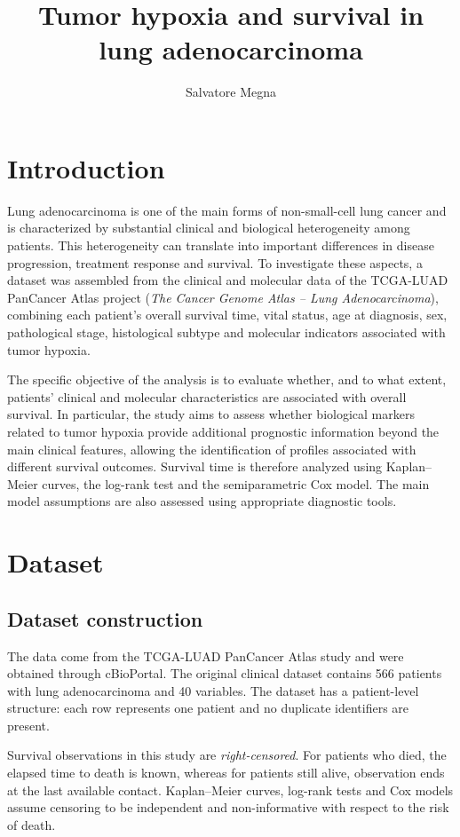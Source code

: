 \documentclass[12pt,a4paper]{article}
\title{Tumor hypoxia and survival in lung adenocarcinoma}
\author{Salvatore Megna}
\date{}
\begin{document}
\maketitle

\section{Introduction}

Lung adenocarcinoma is one of the main forms of non-small-cell lung cancer and is characterized by substantial clinical and biological heterogeneity among patients. This heterogeneity can translate into important differences in disease progression, treatment response and survival. To investigate these aspects, a dataset was assembled from the clinical and molecular data of the TCGA-LUAD PanCancer Atlas project (\textit{The Cancer Genome Atlas -- Lung Adenocarcinoma}), combining each patient's overall survival time, vital status, age at diagnosis, sex, pathological stage, histological subtype and molecular indicators associated with tumor hypoxia.

The specific objective of the analysis is to evaluate whether, and to what extent, patients' clinical and molecular characteristics are associated with overall survival. In particular, the study aims to assess whether biological markers related to tumor hypoxia provide additional prognostic information beyond the main clinical features, allowing the identification of profiles associated with different survival outcomes. Survival time is therefore analyzed using Kaplan--Meier curves, the log-rank test and the semiparametric Cox model. The main model assumptions are also assessed using appropriate diagnostic tools.

\section{Dataset}

\subsection{Dataset construction}

The data come from the TCGA-LUAD PanCancer Atlas study and were obtained through cBioPortal. The original clinical dataset contains 566 patients with lung adenocarcinoma and 40 variables. The dataset has a patient-level structure: each row represents one patient and no duplicate identifiers are present.

Survival observations in this study are \textit{right-censored}. For patients who died, the elapsed time to death is known, whereas for patients still alive, observation ends at the last available contact. Kaplan--Meier curves, log-rank tests and Cox models assume censoring to be independent and non-informative with respect to the risk of death.
\end{document}
